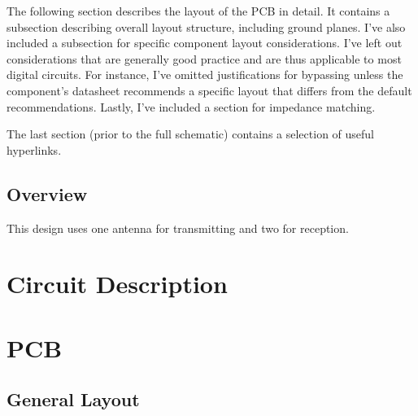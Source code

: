 \documentclass{default}
\begin{document}
The following section describes the layout of the PCB in detail. It contains a subsection describing
overall layout structure, including ground planes. I've also included a subsection for specific
component layout considerations. I've left out considerations that are generally good practice and
are thus applicable to most digital circuits. For instance, I've omitted justifications for
bypassing unless the component's datasheet recommends a specific layout that differs from the
default recommendations. Lastly, I've included a section for impedance matching.

The last section (prior to the full schematic) contains a selection of useful hyperlinks.

\section{Overview}
\label{sec:overview}

This design uses one antenna for transmitting and two for reception.

\chapter{Circuit Description}
\label{cha:circuit}











\chapter{PCB}
\section{General Layout}
\end{document}

